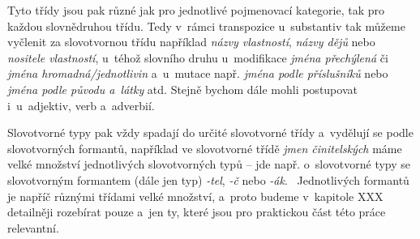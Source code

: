 Tyto třídy jsou pak různé jak pro jednotlivé pojmenovací kategorie, tak
pro každou slovnědruhou třídu. Tedy v~rámci transpozice u~substantiv tak
můžeme vyčlenit za slovotvornou třídu například \emph{názvy vlastností},
\emph{názvy dějů} nebo \emph{nositele vlastností}, u~téhož slovního
druhu u~modifikace \emph{jména přechýlená} či \emph{jména
hromadná/jednotlivin} a~u~mutace např. \emph{jména podle příslušníků}
nebo \emph{jména podle původu a~látky} atd. Stejně bychom dále mohli
postupovat i~u~adjektiv, verb a~adverbií.

Slovotvorné typy pak vždy spadají do určité slovotvorné třídy a~vydělují
se podle slovotvorných formantů, například ve slovotvorné třídě
\emph{jmen činitelských} máme velké množství jednotlivých slovotvorných
typů -- jde např. o~slovotvorné typy se slovotvorným formantem (dále jen
typ) \emph{-tel}, \emph{-č} nebo \emph{-ák}.~\parencite[108]{dokulil00}
Jednotlivých formantů je napříč různými třídami velké množství, a~proto
budeme v~kapitole XXX detailněji rozebírat pouze a~jen ty, které jsou
pro praktickou část této práce relevantní.
